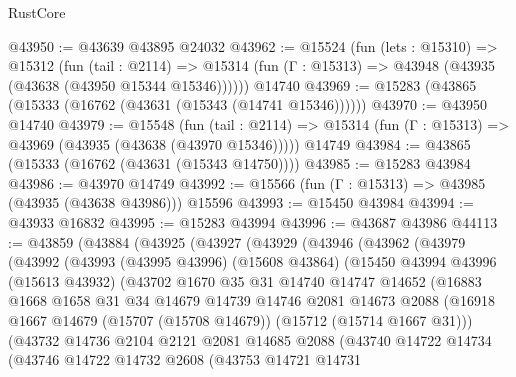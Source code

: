 \begin{lexlean}{RustCore}
\begin{coremodule}
@43950 := @43639 @43895 @24032
@43962 := @15524
    (fun (lets : @15310) =>
    @15312
      (fun (tail : @2114) =>
      @15314 (fun (Γ : @15313) => @43948 (@43935 (@43638 (@43950 @15344 @15346))))))
    @14740
@43969 := @15283 (@43865 (@15333 (@16762 (@43631 (@15343 (@14741 @15346))))))
@43970 := @43950 @14740
@43979 := @15548
    (fun (tail : @2114) => @15314 (fun (Γ : @15313) => @43969 (@43935 (@43638 (@43970 @15346)))))
    @14749
@43984 := @43865 (@15333 (@16762 (@43631 (@15343 @14750))))
@43985 := @15283 @43984
@43986 := @43970 @14749
@43992 := @15566 (fun (Γ : @15313) => @43985 (@43935 (@43638 @43986))) @15596
@43993 := @15450 @43984
@43994 := @43933 @16832
@43995 := @15283 @43994
@43996 := @43687 @43986
@44113 := @43859
    (@43884
      (@43925
        (@43927
          (@43929
            (@43946
              (@43962
                (@43979
                  (@43992
                    (@43993
                      (@43995 @43996)
                      (@15608 @43864)
                      (@15450
                        @43994
                        @43996
                        (@15613 @43932)
                        (@43702
                          @1670
                          @35
                          @31
                          @14740
                          @14747
                          @14652
                          (@16883
                            @1668
                            @1658
                            @31
                            @34
                            @14679
                            @14739
                            @14746
                            @2081
                            @14673
                            @2088
                            (@16918
                              @1667
                              @14679
                              (@15707 (@15708 @14679))
                              (@15712 (@15714 @1667 @31)))
                            (@43732
                              @14736
                              @2104
                              @2121
                              @2081
                              @14685
                              @2088
                              (@43740
                                @14722
                                @14734
                                (@43746
                                  @14722
                                  @14732
                                  @2608
                                  (@43753
                                    @14721
                                    @14731

\end{coremodule}
\end{lexlean}
